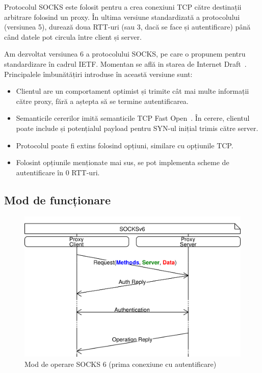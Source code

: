 Protocolul SOCKS este folosit pentru a crea conexiuni TCP către destinații arbitrare folosind un proxy.
În ultima versiune standardizată a protocolului (versiunea 5), durează doua RTT-uri (sau 3, dacă se face și autentificare) până când datele pot circula între client și server.

Am dezvoltat versiunea 6 a protocolului SOCKS, pe care o propunem pentru standardizare în cadrul IETF. Momentan se află in starea de Internet Draft~\cite{socks6}.
Principalele îmbunătățiri introduse în această versiune sunt:
\begin{itemize}
	\item Clientul are un comportament optimist și trimite cât mai multe informații către proxy, fără a aștepta să se termine autentificarea.
	\item Semanticile cererilor imită semanticile TCP Fast Open~\cite{rfc7413}. În cerere, clientul poate include și potențialul payload pentru SYN-ul inițial trimis către server.
	\item Protocolul poate fi extins folosind opțiuni, similare cu opțiunile TCP.
	\item Folosint opțiunile menționate mai sus, se pot implementa scheme de autentificare în 0 RTT-uri.
\end{itemize}

\subsection{Mod de funcționare}


\begin{figure}[h]
	\centering
	\includegraphics[scale=0.7]{figures/socks/socks6op1st.png}
	\caption{Mod de operare SOCKS 6 (prima conexiune cu autentificare)}
    	\label{fig:socks6op1st}
\end{figure}


